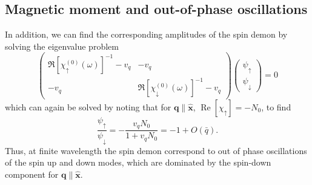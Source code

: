 \documentclass[aps,prb,reprint,twocolumns,superscriptaddress,nofootinbib]{revtex4-2}
\DeclareMathOperator{\Ree}{Re}
\newcommand{\xx}{\hat{\bm{x}}}
\begin{document}
	\subsection{Magnetic moment and out-of-phase oscillations}
	In addition, we can find the corresponding amplitudes of the spin demon by solving the eigenvalue problem 
	\begin{equation}
		\begin{pmatrix}
			\Re[\chi_{\uparrow}^{(0)}(\omega)]^{-1}-v_q & -v_q \\
			-v_q & \Re[\chi_{\downarrow}^{(0)}(\omega)]^{-1}-v_q
		\end{pmatrix}\begin{pmatrix}
			\psi_\uparrow \\ \psi_\downarrow
		\end{pmatrix} =0
	\end{equation}
	which can again be solved by noting that for $\bm q\parallel\xx$, $\Ree[\chi_\uparrow]=-N_0$, to find
	\begin{equation}
		\frac{\psi_\uparrow}{\psi_\downarrow} = 
		-
		\frac{v_q N_0}{1+v_qN_0} = -1 + O(\bar q).
	\end{equation}
	Thus, at finite wavelength the spin demon correspond to  out of phase oscillations of the spin up and down modes, which are dominated by the spin-down component for $\bm q\parallel \xx$.
	
\end{document}
